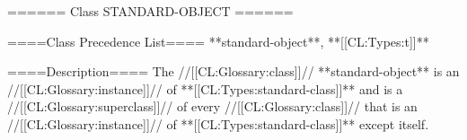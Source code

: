 ====== Class STANDARD-OBJECT ======

====Class Precedence List==== 
**standard-object**, **[[CL:Types:t]]**

====Description====
The //[[CL:Glossary:class]]// **standard-object** is an //[[CL:Glossary:instance]]// of **[[CL:Types:standard-class]]** and is a //[[CL:Glossary:superclass]]// of every //[[CL:Glossary:class]]// that is an //[[CL:Glossary:instance]]// of **[[CL:Types:standard-class]]** except itself.

